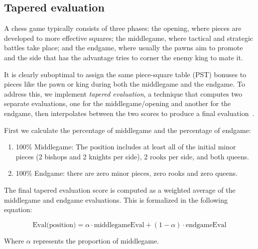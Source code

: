 \subsection{Tapered evaluation}

A chess game typically consists of three phases: the opening, where pieces are developed to more effective squares; the middlegame, where tactical and strategic battles take place; and the endgame, where usually the pawns aim to promote and the side that has the advantage tries to corner the enemy king to mate it.

\vspace{1em}

\noindent It is clearly suboptimal to assign the same piece-square table (PST) bonuses to pieces like the pawn or king during both the middlegame and the endgame. To address this, we implement \textit{tapered evaluation}, a technique that computes two separate evaluations, one for the middlegame/opening and another for the endgame, then interpolates between the two scores to produce a final evaluation~\cite{TaperedEvaluation}.

\vspace{1em}

\noindent First we calculate the percentage of middlegame and the percentage of endgame:

\begin{enumerate}
    \item 100\% Middlegame: The position includes at least all of the initial minor pieces (2 bishops and 2 knights per side), 2 rooks per side, and both queens.
    \item 100\% Endgame: there are zero minor pieces, zero rooks and zero queens.
\end{enumerate}

\noindent The final tapered evaluation score is computed as a weighted average of the middlegame and endgame evaluations. This is formalized in the following equation:

\begin{minipage}{0.8\linewidth}
    \centering
    \begin{equation*}
        \text{Eval(position)} = \alpha \cdot \text{middlegameEval} + (1 - \alpha) \cdot \text{endgameEval}
    \end{equation*}
    \vspace{-1em}
\end{minipage}

\noindent Where $\alpha$ represents the proportion of middlegame.

